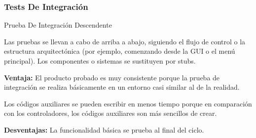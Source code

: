 \begin{frame}
    \frametitle{Tests De Integración}

    \begin{block}{Prueba De Integración Descendente}

        Las pruebas se llevan a cabo de arriba a abajo, siguiendo el 
        flujo de control o la estructura arquitectónica (por ejemplo, 
        comenzando desde la GUI o el menú principal). Los componentes
         o sistemas se sustituyen por stubs.
        
        \textbf{Ventaja:} El producto probado es muy consistente porque 
        la prueba de integración se realiza básicamente en un entorno 
        casi similar al de la realidad.
        
        Los códigos auxiliares se pueden escribir en menos tiempo porque
        en comparación con los controladores, los códigos auxiliares son 
        más sencillos de crear.
        
        \textbf{Desventajas:} La funcionalidad básica se prueba al final 
        del ciclo.
    \end{block}
\end{frame}

